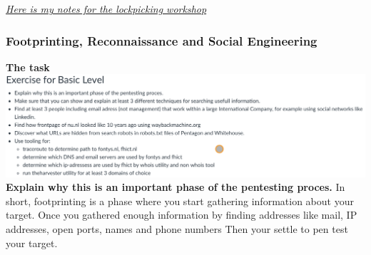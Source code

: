 \documentclass[12pt, letterpaper]{article}
\begin{document}
\hyperref[workshop:week2Lockpicking]{\emph{Here is my notes for the lockpicking workshop}}
\newpage
\subsubsection{Footprinting, Reconnaissance and Social Engineering}
\textbf{The task}
\hfill\break
\includegraphics[width=1\textwidth]{PDFs/Week 2/Opdracht footprinting.jpeg}
\hfill\break
\textbf{Explain why this is an important phase of the pentesting proces.}
\hfill\break
In short, footprinting is a phase where you start gathering information about your target. Once you gathered enough information by finding addresses like mail, IP addresses, open ports, names and phone numbers Then your settle to pen test your target.
\end{document}
